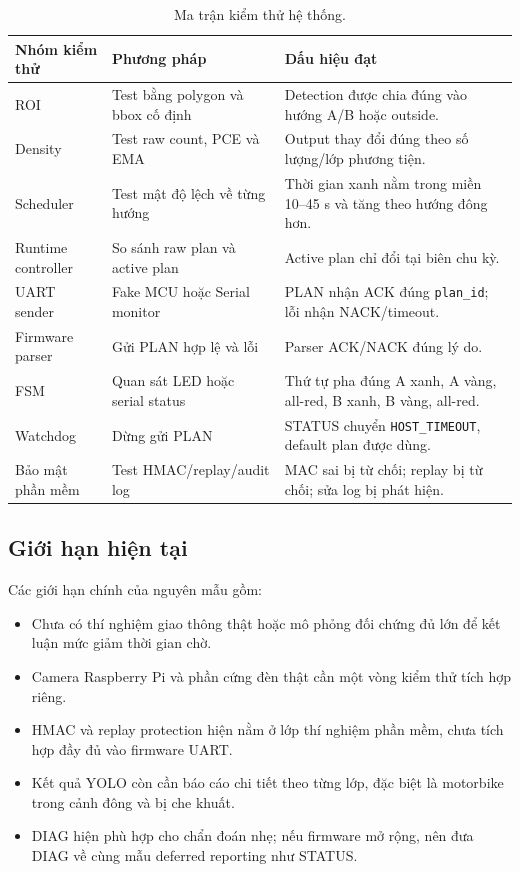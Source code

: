 \begin{table}[H]
\centering
\caption{Ma trận kiểm thử hệ thống.}
\label{tab:test-matrix}
\footnotesize
\setlength{\tabcolsep}{4pt}
\renewcommand{\arraystretch}{1.16}
\begin{tabularx}{\linewidth}{R{2.9cm}Y Y}
\toprule
\textbf{Nhóm kiểm thử} & \textbf{Phương pháp} & \textbf{Dấu hiệu đạt} \\
\midrule
ROI & Test bằng polygon và bbox cố định & Detection được chia đúng vào hướng A/B hoặc outside. \\
Density & Test raw count, PCE và EMA & Output thay đổi đúng theo số lượng/lớp phương tiện. \\
Scheduler & Test mật độ lệch về từng hướng & Thời gian xanh nằm trong miền 10--45 s và tăng theo hướng đông hơn. \\
Runtime controller & So sánh raw plan và active plan & Active plan chỉ đổi tại biên chu kỳ. \\
UART sender & Fake MCU hoặc Serial monitor & PLAN nhận ACK đúng \texttt{plan\_id}; lỗi nhận NACK/timeout. \\
Firmware parser & Gửi PLAN hợp lệ và lỗi & Parser ACK/NACK đúng lý do. \\
FSM & Quan sát LED hoặc serial status & Thứ tự pha đúng A xanh, A vàng, all-red, B xanh, B vàng, all-red. \\
Watchdog & Dừng gửi PLAN & STATUS chuyển \texttt{HOST\_TIMEOUT}, default plan được dùng. \\
Bảo mật phần mềm & Test HMAC/replay/audit log & MAC sai bị từ chối; replay bị từ chối; sửa log bị phát hiện. \\
\bottomrule
\end{tabularx}
\normalsize
\end{table}

\subsection{Giới hạn hiện tại}

Các giới hạn chính của nguyên mẫu gồm:

\begin{itemize}
  \item Chưa có thí nghiệm giao thông thật hoặc mô phỏng đối chứng đủ lớn để kết luận mức giảm thời gian chờ.
  \item Camera Raspberry Pi và phần cứng đèn thật cần một vòng kiểm thử tích hợp riêng.
  \item HMAC và replay protection hiện nằm ở lớp thí nghiệm phần mềm, chưa tích hợp đầy đủ vào firmware UART.
  \item Kết quả YOLO còn cần báo cáo chi tiết theo từng lớp, đặc biệt là motorbike trong cảnh đông và bị che khuất.
  \item DIAG hiện phù hợp cho chẩn đoán nhẹ; nếu firmware mở rộng, nên đưa DIAG về cùng mẫu deferred reporting như STATUS.
\end{itemize}
